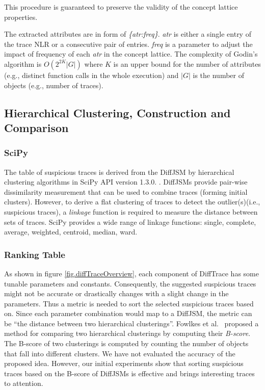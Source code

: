%
This procedure is guaranteed to preserve the validity of the concept lattice properties.
%

The extracted attributes are in form of \textit{\{atr:freq\}}. 
%
\textit{atr} is either a single entry of the trace NLR or a consecutive pair of entries. \textit{freq} is a parameter to adjust the impact of frequency of each \textit{atr} in the concept lattice.
%
The complexity of Godin's algorithm is $O(2^{2K}|G|)$ where $K$ is an upper bound for the number of attributes (e.g., distinct function calls in the whole execution) and $|G|$ is the number of objects (e.g., number of traces).




\subsection{Hierarchical Clustering, Construction and Comparison}
 \label{subsec:algo-bscore}
 
\subsubsection{SciPy}
The table of suspicious traces is derived from the DiffJSM by hierarchical clustering algorithms in SciPy API version 1.3.0. \cite{scipy}.
%
DiffJSMs provide pair-wise dissimilarity measurement that can be used to combine traces (forming initial clusters).
%
However, to derive a flat clustering of traces to detect the outlier(s)(i.e., suspicious traces), a \textit{linkage} function is required to measure the distance between sets of traces.
%
SciPy provides a wide range of linkage functions: single, complete, average, weighted, centroid, median, ward.

\subsubsection{Ranking Table}
As shown in figure \ref{fig.diffTraceOverview}, each component of DiffTrace has some tunable parameters and constants.
%
Consequently, the suggested suspicious traces might not be accurate or drastically changes with a slight change in the parameters.
%
Thus a metric is needed to sort the selected suspicious traces based on.
%
Since each parameter combination would map to a DiffJSM, the metric can be ``the distance between two hierarchical clusterings''.
%
Fowlkes et al.~\cite{fowlkes83} proposed a method for comparing two hierarchical clusterings by computing their \textit{B-score}.
%
The B-score of two clusterings is computed by counting the number of objects that fall into different clusters.
%
We have not evaluated the accuracy of the proposed idea.
%
However, our initial experiments show that sorting suspicious traces based on the B-score of DiffJSMs is effective and brings interesting traces to attention.

